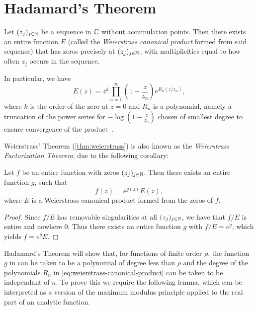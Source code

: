 \section{Hadamard's Theorem}
\label{sec:hadamards-theorem}

\begin{theorem} \label{thm:weierstrass}
    Let $(z_j)_{j \in \mathbb{N}}$ be a sequence in $\mathbb{C}$ without accumulation points. Then there exists an entire function $E$ (called the \emph{Weierstrass canonical product} formed from said sequence) that has zeros precisely at $(z_j)_{j \in \mathbb{N}}$, with multiplicities equal to how often $z_j$ occurs in the sequence.
\end{theorem}

In particular, we have
\begin{equation} \label{eq:weierstrass-canonical-product}
    E(z) = z^k \prod_{n=1}^\infty \left( 1 - \frac{z}{z_n} \right) e^{R_n(z / z_n)},
\end{equation}
where $k$ is the order of the zero at $z = 0$ and $R_n$ is a polynomial, namely a truncation of the power series for $-\log(1 - \frac{z}{z_n})$ chosen of smallest degree to ensure convergence of the product~\cite{segal-complex-analysis}.

Weierstrass' Theorem (\ref{thm:weierstrass}) is also known as the \emph{Weierstrass Factorization Theorem}, due to the following corollary:

\begin{corollary} \label{cor:weierstrass-factorization}
    Let $f$ be an entire function with zeros $(z_j)_{j \in \mathbb{N}}$. Then there exists an entire function $g$, such that
    $$ f(z) = e^{g(z)} E(z), $$
    where $E$ is a Weierstrass canonical product formed from the zeros of $f$.
\end{corollary}

\begin{proof}
    Since $f / E$ has removable singularities at all $(z_j)_{j \in \mathbb{N}}$, we have that $f / E$ is entire and nowhere $0$. Thus there exists an entire function $g$ with $f / E = e^g$, which yields $f = e^g E$.
\end{proof}

Hadamard's Theorem will show that, for functions of finite order $\rho$, the function $g$ in  can be taken to be a polynomial of degree less than $\rho$ and the degree of the polynomials $R_n$ in \cref{eq:weierstrass-canonical-product} can be taken to be independant of $n$. To prove this we require the following lemma, which can be interpreted as a version of the maximum modulus principle applied to the real part of an analytic function.

